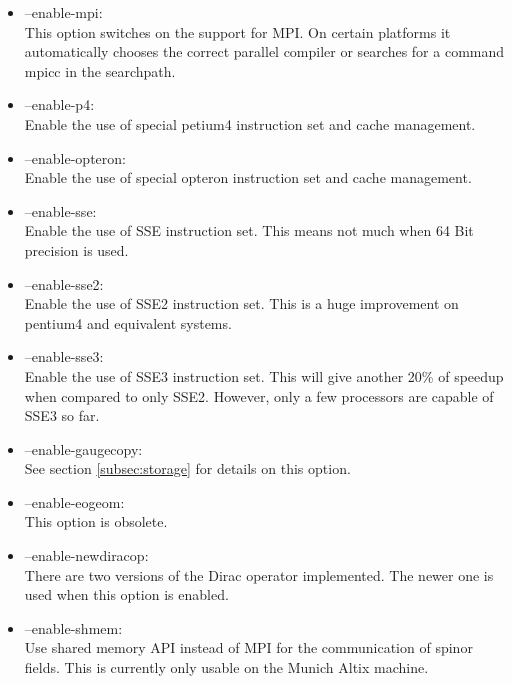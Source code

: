 \begin{itemize}
\item {\ttfamily --enable-mpi}:\\
  This option switches on the support for MPI. On certain platforms it
  automatically chooses the correct parallel compiler or searches for
  a command {\ttfamily mpicc} in the searchpath.

\item {\ttfamily --enable-p4}:\\
  Enable the use of special petium4 instruction set and cache
  management.

\item {\ttfamily --enable-opteron}:\\
  Enable the use of special opteron instruction set and cache
  management.

\item {\ttfamily --enable-sse}:\\
  Enable the use of SSE instruction set. This means not much when 64
  Bit precision is used.

\item {\ttfamily --enable-sse2}:\\
  Enable the use of SSE2 instruction set. This is a huge improvement
  on pentium4 and equivalent systems.

\item {\ttfamily --enable-sse3}:\\
  Enable the use of SSE3 instruction set. This will give another 20\%
  of speedup when compared to only SSE2. However, only a few
  processors are capable of SSE3 so far.

\item {\ttfamily --enable-gaugecopy}:\\
  See section \ref{subsec:storage} for details on this option.

\item {\ttfamily --enable-eogeom}:\\
  This option is obsolete.

\item {\ttfamily --enable-newdiracop}:\\
  There are two versions of the Dirac operator implemented. The newer
  one is used when this option is enabled.

\item {\ttfamily --enable-shmem}:\\
  Use shared memory API instead of MPI for the communication of spinor
  fields. This is currently only usable on the Munich Altix machine.


\end{itemize}
